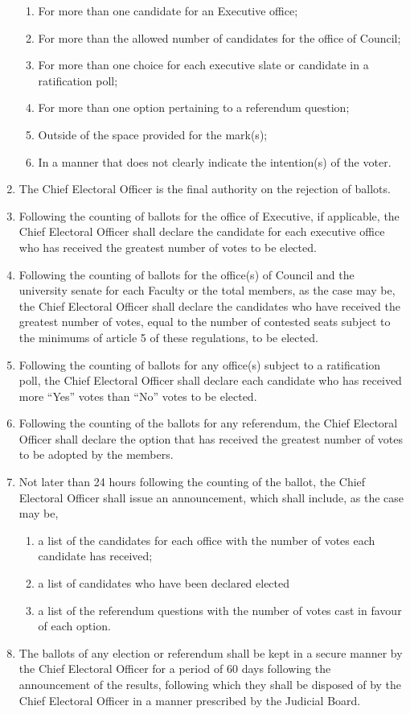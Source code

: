 \documentclass[oneside]{book}
\begin{document}
\begin{enumerate}
\begin{enumerate}
\item For more than one candidate for an Executive office; 
\item For more than the allowed number of candidates for the office of Council; 
\item For more than one choice for each executive slate or candidate in
a ratification poll; 
\item For more than one option pertaining to a referendum question; 
\item Outside of the space provided for the mark(s); 
\item In a manner that does not clearly indicate the intention(s) of the
voter. 
\end{enumerate}
\item The Chief Electoral Officer is the final authority on the rejection
of ballots. 
\item Following the counting of ballots for the office of Executive, if
applicable, the Chief Electoral Officer shall declare the candidate
for each executive office who has received the greatest number of
votes to be elected. 
\item Following the counting of ballots for the office(s) of Council and
the university senate for each Faculty or the total members, as the
case may be, the Chief Electoral Officer shall declare the candidates
who have received the greatest number of votes, equal to the number
of contested seats subject to the minimums of article 5 of these regulations,
to be elected. 
\item Following the counting of ballots for any office(s) subject to a ratification
poll, the Chief Electoral Officer shall declare each candidate who
has received more ``Yes'' votes than ``No''
votes to be elected. 
\item Following the counting of the ballots for any referendum, the Chief
Electoral Officer shall declare the option that has received the greatest
number of votes to be adopted by the members. 
\item \label{announcement-of-results}Not later than 24 hours following
the counting of the ballot, the Chief Electoral Officer shall issue
an announcement, which shall include, as the case may be, 

\begin{enumerate}
\item a list of the candidates for each office with the number of votes
each candidate has received; 
\item a list of candidates who have been declared elected 
\item a list of the referendum questions with the number of votes cast in
favour of each option. 
\end{enumerate}
\item The ballots of any election or referendum shall be kept in a secure
manner by the Chief Electoral Officer for a period of 60 days following
the announcement of the results, following which they shall be disposed
of by the Chief Electoral Officer in a manner prescribed by the Judicial
Board. 


\end{enumerate}
\end{document}
